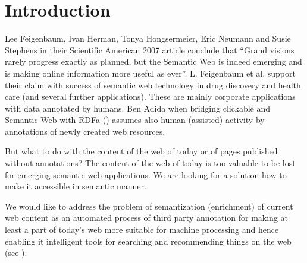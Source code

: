 \documentclass{www2009-submission}
\begin{document}


\section{Introduction}



Lee Feigenbaum, Ivan Herman, Tonya Hongsermeier, Eric Neumann and Susie Stephens in their Scientific American 2007 article \cite{biblio:feigenbaum_semantic_2007} conclude that ``Grand visions rarely progress exactly as planned, but the Semantic Web is indeed emerging and is making online information more useful as ever''. L. Feigenbaum et al. support their claim with success of semantic web technology in drug discovery and health care (and several further applications). These are mainly corporate applications with data annotated by humans. Ben Adida when bridging clickable and Semantic Web with RDFa (\cite{biblio:AdidaClickable}) assumes also human (assisted) activity by annotations of newly created web resources. \par

But what to do with the content of the web of today or of pages published without annotations? The content of the web of today is too valuable to be lost for emerging semantic web applications. We are looking for a solution how to make it accessible in semantic manner. \par

We would like to address the problem of semantization (enrichment) of current web content as an automated process of third party annotation for making at least a part of today's web more suitable for machine processing and hence enabling it intelligent tools for searching and recommending things on the web (see \cite{biblio:LeeWebThings}). \par
\end{document}
